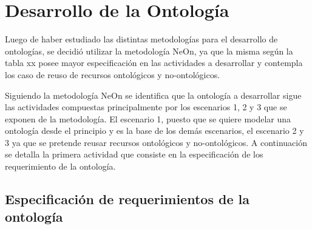 \chapter{Desarrollo de la Ontología}
\label{chap:Desarrollo de la Ontologia}

Luego de haber estudiado las distintas metodologías para el desarrollo de ontologías, se decidió utilizar la metodología NeOn, ya que la misma según la tabla xx posee mayor especificación en las actividades a desarrollar  y contempla los caso de reuso de recursos ontológicos y no-ontológicos. 

Siguiendo la metodología NeOn se identifica que la ontología a desarrollar sigue las actividades compuestas principalmente por los escenarios 1, 2 y 3 que se exponen de la metodología. El escenario 1, puesto que se quiere modelar una ontología desde el principio y es la base de los demás escenarios, el escenario 2 y 3 ya que se pretende reusar recursos ontológicos y no-ontológicos. A continuación se detalla la primera actividad que consiste en la especificación de los requerimiento de la ontología.


\section{Especificación de requerimientos de la ontología}

